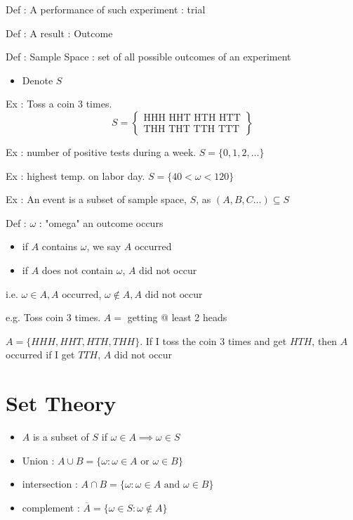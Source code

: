 Def : A performance of such experiment : trial

Def : A result : Outcome

Def : Sample Space : set of all possible outcomes of an experiment
\begin{itemize}
    \item Denote $S$
\end{itemize}
Ex : Toss a coin 3 times.
\begin{equation*}
    S = 
    \begin{Bmatrix} 
	\text{HHH HHT HTH HTT} \\
	\text{THH THT TTH TTT}
    \end{Bmatrix}
\end{equation*}

Ex : number of positive tests during a week. $S = \{0, 1, 2, \ldots \}$  
 
Ex : highest temp. on labor day. $S = \{40 < \omega < 120 \}$ 

Ex : An event is a subset of sample space, $S$, as $(A, B, C \ldots) \subseteq S$

Def :  $\omega$ : "omega" an outcome occurs
 \begin{itemize}
    \item if $A$ contains $\omega$, we say $A$ occurred
    \item if $A$ does not contain $\omega$, $A$ did not occur
\end{itemize}
i.e. $\omega  \in A, A \text{ occurred}$, $\omega \not\in A, A \text{ did not occur}$

e.g. Toss coin 3 times. $A = $ getting @ least 2 heads

$A = \{ HHH, HHT, HTH, THH \}$. If I toss the coin 3 times and get  $HTH$, then $A$ occurred if I get $TTH$, $A$ did not occur

\chapter*{Set Theory}
\begin{itemize}
    \item $A$ is a subset of $S$ if $\omega \in A \implies \omega \in S$ 
    \item Union : $A \cup B = \{ \omega : \omega \in A \text{ or } \omega \in B \}$
    \item intersection : $A \cap B = \{ \omega : \omega \in A \text{ and } \omega \in B \}$
    \item complement : $\overline{A} = \{ \omega \in S : \omega \not\in A \}$
\end{itemize}

